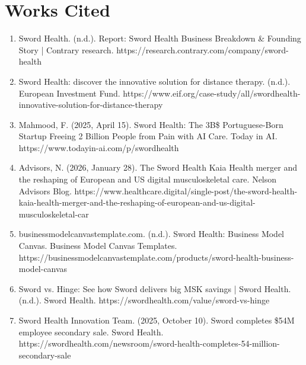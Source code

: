 \documentclass[12pt]{article}
\begin{document}
\newpage
\section*{Works Cited}
\begin{enumerate}
    \item Sword Health. (n.d.). Report: Sword Health Business Breakdown & Founding Story | Contrary research. https://research.contrary.com/company/sword-health
    \item Sword Health: discover the innovative solution for distance therapy. (n.d.). European Investment Fund. https://www.eif.org/case-study/all/swordhealth-innovative-solution-for-distance-therapy
    \item Mahmood, F. (2025, April 15). Sword Health: The 3B\$ Portuguese-Born Startup Freeing 2 Billion People from Pain with AI Care. Today in AI. https://www.todayin-ai.com/p/swordhealth
    \item Advisors, N. (2026, January 28). The Sword Health Kaia Health merger and the reshaping of European and US digital musculoskeletal care. Nelson Advisors Blog. https://www.healthcare.digital/single-post/the-sword-health-kaia-health-merger-and-the-reshaping-of-european-and-us-digital-musculoskeletal-car
    \item businessmodelcanvastemplate.com. (n.d.). Sword Health: Business Model Canvas. Business Model Canvas Templates. https://businessmodelcanvastemplate.com/products/sword-health-business-model-canvas
    \item Sword vs. Hinge: See how Sword delivers big MSK savings | Sword Health. (n.d.). Sword Health. https://swordhealth.com/value/sword-vs-hinge
    \item Sword Health Innovation Team. (2025, October 10). Sword completes \$54M employee secondary sale. Sword Health. https://swordhealth.com/newsroom/sword-health-completes-54-million-secondary-sale



\end{enumerate}
\end{document}
